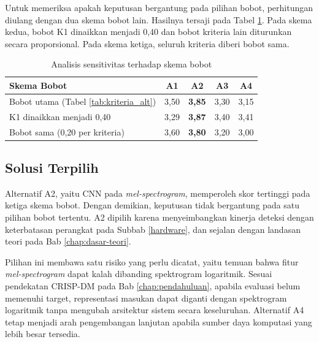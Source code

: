 Untuk memeriksa apakah keputusan bergantung pada pilihan bobot, perhitungan diulang dengan dua skema bobot lain. Hasilnya tersaji pada Tabel \ref{tab:sensitivitas}. Pada skema kedua, bobot K1 dinaikkan menjadi 0,40 dan bobot kriteria lain diturunkan secara proporsional. Pada skema ketiga, seluruh kriteria diberi bobot sama.

\begin{table}[t]
  \centering
  \small
  \caption{Analisis sensitivitas terhadap skema bobot}
  \label{tab:sensitivitas}
  \renewcommand{\arraystretch}{1.25}
  \begin{tabular}{| l | c | c | c | c |}
    \hline
    \textbf{Skema Bobot} & \textbf{A1} & \textbf{A2} & \textbf{A3} & \textbf{A4} \\
    \hline
    Bobot utama (Tabel \ref{tab:kriteria_alt}) & 3,50 & \textbf{3,85} & 3,30 & 3,15 \\
    K1 dinaikkan menjadi 0,40                  & 3,29 & \textbf{3,87} & 3,40 & 3,41 \\
    Bobot sama (0,20 per kriteria)             & 3,60 & \textbf{3,80} & 3,20 & 3,00 \\
    \hline
  \end{tabular}
\end{table}

\subsection{Solusi Terpilih}
\label{solusi_terpilih}

Alternatif A2, yaitu CNN pada \textit{mel-spectrogram}, memperoleh skor tertinggi pada ketiga skema bobot. Dengan demikian, keputusan tidak bergantung pada satu pilihan bobot tertentu. A2 dipilih karena menyeimbangkan kinerja deteksi dengan keterbatasan perangkat pada Subbab \ref{hardware}, dan sejalan dengan landasan teori pada Bab \ref{chap:dasar-teori}.

Pilihan ini membawa satu risiko yang perlu dicatat, yaitu temuan \textcite{muller2022generalize} bahwa fitur \textit{mel-spectrogram} dapat kalah dibanding spektrogram logaritmik. Sesuai pendekatan CRISP-DM pada Bab \ref{chap:pendahuluan}, apabila evaluasi belum memenuhi target, representasi masukan dapat diganti dengan spektrogram logaritmik tanpa mengubah arsitektur sistem secara keseluruhan. Alternatif A4 tetap menjadi arah pengembangan lanjutan apabila sumber daya komputasi yang lebih besar tersedia.

